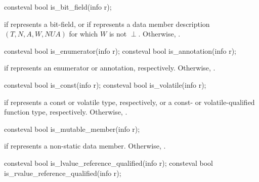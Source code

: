 %
\begin{itemdecl}
consteval bool is_bit_field(info r);
\end{itemdecl}

\begin{itemdescr}
\pnum
\returns
{} if  represents a bit-field,
or if  represents a data member description
$(T, N, A, W, \mathit{NUA})$
for which $W$ is not $\perp$.
Otherwise, .
\end{itemdescr}

%
%
\begin{itemdecl}
consteval bool is_enumerator(info r);
consteval bool is_annotation(info r);
\end{itemdecl}

\begin{itemdescr}
\pnum
\returns
{} if  represents an enumerator or annotation, respectively.
Otherwise, .
\end{itemdescr}

%
%
\begin{itemdecl}
consteval bool is_const(info r);
consteval bool is_volatile(info r);
\end{itemdecl}

\begin{itemdescr}
\pnum
\returns
{} if  represents a const or volatile type, respectively,
or a const- or volatile-qualified function type, respectively.
Otherwise, .
\end{itemdescr}

%
\begin{itemdecl}
consteval bool is_mutable_member(info r);
\end{itemdecl}

\begin{itemdescr}
\pnum
\returns
{} if  represents a  non-static data member.
Otherwise, .
\end{itemdescr}

%
%
\begin{itemdecl}
consteval bool is_lvalue_reference_qualified(info r);
consteval bool is_rvalue_reference_qualified(info r);
\end{itemdecl}

